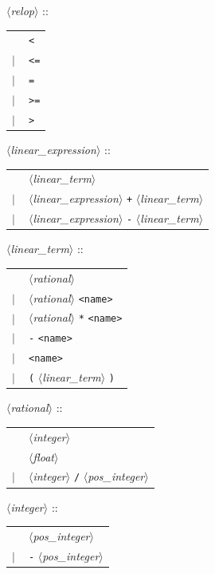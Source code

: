 \documentclass[a4paper,11pt]{report}
\newcommand{\nt}[1]{$\langle$\emph{#1}$\rangle$}
\newcommand{\regleGrammaire}[1]{\bigskip \noindent \nt{#1} :: \\}
\newcommand{\styleIMI}[1]{\textcolor{imicolor}{\texttt{#1}}}
\begin{document}
\regleGrammaire{relop}
\begin{tabular}{l l}
	\  & \styleIMI{<} \\
	$|$ & \styleIMI{<=} \\
	$|$ & \styleIMI{=} \\
	$|$ & \styleIMI{>=} \\
	$|$ & \styleIMI{>} \\
\end{tabular}

\regleGrammaire{linear\_expression}
\begin{tabular}{l l}
	\  & \nt{linear\_term} \\
	$|$ & \nt{linear\_expression} \styleIMI{+} \nt{linear\_term} \\
	$|$ & \nt{linear\_expression} \styleIMI{-} \nt{linear\_term} \\
\end{tabular}

\regleGrammaire{linear\_term}
\begin{tabular}{l l}
	\  & \nt{rational} \\
	$|$ & \nt{rational} \styleIMI{<name>} \\
	$|$ & \nt{rational} \styleIMI{*} \styleIMI{<name>} \\
	$|$ & \styleIMI{-} \styleIMI{<name>} \\
	$|$ & \styleIMI{<name>} \\
	$|$ & \styleIMI{(} \nt{linear\_term} \styleIMI{)} \\
\end{tabular}

\regleGrammaire{rational}
\begin{tabular}{l l}
	\  & \nt{integer} \\
	\  & \nt{float} \\
	$|$ & \nt{integer} \styleIMI{/} \nt{pos\_integer}  \\
\end{tabular}

\regleGrammaire{integer}
\begin{tabular}{l l}
	\  & \nt{pos\_integer} \\
	$|$ & \styleIMI{-} \nt{pos\_integer}  \\
\end{tabular}
\end{document}
